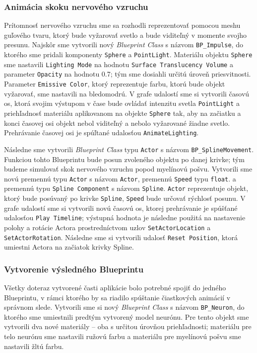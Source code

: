 \subsubsection{Animácia skoku nervového vzruchu}
Prítomnosť nervového vzruchu sme sa rozhodli reprezentovať pomocou meshu guľového tvaru, ktorý bude vyžarovať svetlo a bude viditeľný v momente svojho presunu. Najskôr sme vytvorili nový \emph{Blueprint Class} s názvom
\texttt{BP\_Impulse}, do ktorého sme pridali komponenty \texttt{Sphere} a \texttt{PointLight}. Materiálu objektu \texttt{Sphere} sme nastavili \texttt{Lighting Mode} na hodnotu \texttt{Surface Translucency Volume} a 
parameter \texttt{Opacity} na hodnotu 0.7; tým sme dosiahli určitú úroveň priesvitnosti. Parameter \texttt{Emissive Color}, ktorý reprezentuje farbu, ktorú bude objekt vyžarovať, sme nastavili na bledomodrú.
V grafe udalostí sme si vytvorili časovú os, ktorá svojim výstupom v čase bude ovládať intenzitu svetla \texttt{PointLight} a priehľadnosť materiálu aplikovanom na objekte \texttt{Sphere} tak, aby na začiatku a konci časovej 
osi objekt nebol viditeľný a nebolo vyžarované žiadne svetlo. Prehrávanie časovej osi je spúľtané udalosťou \texttt{AnimateLighting}.

Následne sme vytvorili \emph{Blueprint Class} typu \texttt{Actor} s názvom \texttt{BP\_SplineMovement}. Funkciou tohto Blueprintu bude posun zvoleného objektu po danej krivke; tým budeme simulovať skok nervového vzruchu
popod myelínovú pošvu. Vytvorili sme novú premennú typu \texttt{Actor} s názvom \texttt{Actor}, premennú \texttt{Speed} typu \texttt{float}. a premennú typu \texttt{Spline Component} s názvom \texttt{Spline}. 
\texttt{Actor} reprezentuje objekt, ktorý bude posúvaný po krivke \texttt{Spline}, \texttt{Speed} bude určovať rýchlosť posunu. V grafe udalostí sme si vytvorili novú časovú os, ktorej prehrávanie je spúšťané udalosťou
\texttt{Play Timeline}; výstupná hodnota je následne použitá na nastavenie polohy a rotácie Actora prostredníctvom uzlov \texttt{SetActorLocation} a \texttt{SetActorRotation}. Následne sme si vytvorili udalosť \texttt{Reset Position},
ktorá umiestni Actora na začiatok krivky Spline.

\subsubsection{Vytvorenie výsledného Blueprintu}
Všetky doteraz vytvorené časti aplikácie bolo potrebné spojiť do jedného Blueprintu, v rámci ktorého by sa riadilo spúštanie čiastkových animácií v správnom slede. Vytvorili sme si nový \emph{Blueprint Class} s názvom
\texttt{BP\_Neuron}, do ktorého sme umiestnili predtým vytvorený model neurónu. Pre tento objekt sme vytvorili dva nové materiály {--} oba s určitou úrovňou priehľadnosti; materiálu pre telo neurónu sme nastavili ružovú farbu a 
materiálu pre myelínovú pošvu sme nastavili žltú farbu.

